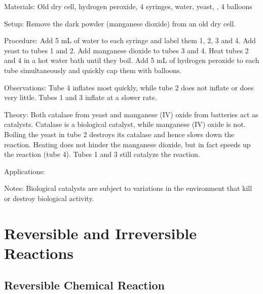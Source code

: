 \begin{multicols}{2}
\begin{description*}
\item[Materials:]{Old dry cell, hydrogen peroxide, 4 syringes, water, yeast, , 4 balloons}
\item[Setup:]{Remove the dark powder (manganese dioxide) from an old dry cell.}
\item[Procedure:]{Add 5 mL of water to each syringe and label them 1, 2, 3 and 4. Add yeast to tubes 1 and 2. Add manganese dioxide to tubes 3 and 4. Heat tubes 2 and 4 in a hot water bath until they boil. Add 5 mL of hydrogen peroxide to each tube simultaneously and quickly cap them with balloons.}
\item[Observations:]{Tube 4 inflates most quickly, while tube 2 does not inflate or does very little. Tubes 1 and 3 inflate at a slower rate.}
\item[Theory:]{Both catalase from yeast and manganese (IV) oxide from batteries act as catalysts. Catalase is a biological catalyst, while manganese (IV) oxide is not. Boiling the yeast in tube 2 destroys its catalase and hence slows down the reaction. Heating does not hinder the manganese dioxide, but in fact speeds up the reaction (tube 4). Tubes 1 and 3 still catalyze the reaction. }
\item[Applications:]{}
\item[Notes:]{Biological catalysts are subject to variations in the environment that kill or destroy biological activity.}
\end{description*}


\section*{Reversible and Irreversible \hfill \\ Reactions} 


\subsection{Reversible Chemical Reaction}



\end{multicols}
